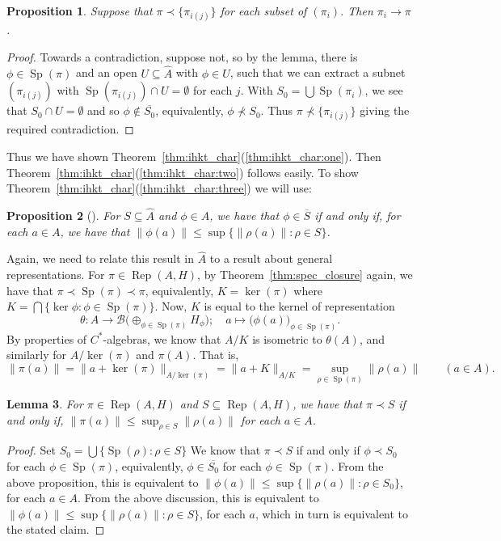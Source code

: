 \documentclass[a4paper,11pt]{article}
\newcommand{\mc}[1]{{\mathcal{#1}}}
\newcommand{\Rep}{\operatorname{Rep}}
\newcommand{\Sp}{\operatorname{Sp}}
\newtheorem{lemma}{Lemma}[section]
\newtheorem{proposition}[lemma]{Proposition}
\begin{document}
\begin{proposition}
Suppose that $\pi\prec \{\pi_{i(j)}\}$ for each subset of $(\pi_i)$.
Then $\pi_i\rightarrow\pi$.
\end{proposition}
\begin{proof}
Towards a contradiction, suppose not, so by the lemma, there is
$\phi\in\Sp(\pi)$ and an open $U\subseteq\hat A$ with $\phi\in U$, such that
we can extract a subnet $(\pi_{i(j)})$ with $\Sp(\pi_{i(j)}) \cap U=\emptyset$
for each $j$.  With $S_0 = \bigcup \Sp(\pi_i)$, we see that
$S_0\cap U=\emptyset$ and so $\phi\not\in\overline{S_0}$, equivalently,
$\phi\not\prec S_0$.  Thus $\pi\not\prec\{\pi_{i(j)}\}$ giving the required
contradiction.
\end{proof}

Thus we have shown Theorem~\ref{thm:ihkt_char}(\ref{thm:ihkt_char:one}).
Then Theorem~\ref{thm:ihkt_char}(\ref{thm:ihkt_char:two}) follows easily.
To show Theorem~\ref{thm:ihkt_char}(\ref{thm:ihkt_char:three}) we will use:

\begin{proposition}[{\cite[Lemma~2.1]{fell4}}]
For $S\subseteq\hat A$ and $\phi\in\hat A$, we have that $\phi\in\overline S$
if and only if, for each $a\in A$, we have that $\|\phi(a)\| \leq
\sup\{\|\rho(a)\|:\rho\in S\}$.
\end{proposition}

Again, we need to relate this result in $\hat A$ to a result about general
representations.  For $\pi\in\Rep(A,H)$, by Theorem~\ref{thm:spec_closure}
again, we have that $\pi \prec \Sp(\pi) \prec \pi$, equivalently, $K=\ker(\pi)$
where $K = \bigcap\{\ker\phi : \phi\in\Sp(\pi) \}$.  Now, $K$ is equal to the
kernel of representation
\[ \theta:A\rightarrow\mc B\Big( \oplus_{\phi\in\Sp(\pi)} H_\phi \Big); \quad
a \mapsto \big( \phi(a) \big)_{\phi\in\Sp(\pi)}. \]
By properties of $C^*$-algebras, we know that $A/K$ is isometric to
$\theta(A)$, and similarly for $A/\ker(\pi)$ and $\pi(A)$.  That is,
\[ \|\pi(a)\| = \|a + \ker(\pi)\|_{A/\ker(\pi)}
= \|a+K\|_{A/K} = \sup_{\rho\in\Sp(\pi)} \|\rho(a)\| \qquad(a\in A). \]

\begin{lemma}
For $\pi\in\Rep(A,H)$ and $S\subseteq\Rep(A,H)$, we have that $\pi\prec S$ if
and only if, $\|\pi(a)\| \leq \sup_{\rho\in S} \|\rho(a)\|$ for each $a\in A$.
\end{lemma}
\begin{proof}
Set $S_0 = \bigcup\{ \Sp(\rho) : \rho\in S \}$
We know that $\pi\prec S$ if and only if $\phi\prec S_0$ for each
$\phi\in\Sp(\pi)$, equivalently, $\phi\in\overline{S_0}$ for each
$\phi\in\Sp(\pi)$.  From the above proposition, this is equivalent to
$\|\phi(a)\| \leq \sup\{ \|\rho(a)\| : \rho\in S_0 \}$, for each $a\in A$.
From the above discussion, this is equivalent to
$\|\phi(a)\| \leq \sup\{ \|\rho(a)\| : \rho\in S \}$, for each $a$,
which in turn is equivalent to the stated claim.
\end{proof}
\end{document}
